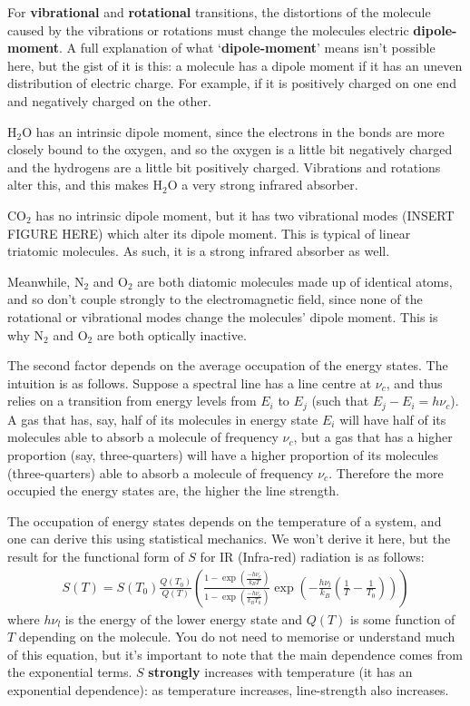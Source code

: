 For \textbf{vibrational} and \textbf{rotational} transitions, the distortions of the molecule caused by the vibrations or rotations must change the molecules electric \textbf{dipole-moment}. A full explanation of what `\textbf{dipole-moment}' means isn't possible here, but the gist of it is this: a molecule has a dipole moment if it has an uneven distribution of electric charge. For example, if it is positively charged on one end and negatively charged on the other.

H$_2$O has an intrinsic dipole moment, since the electrons in the bonds are more closely bound to the oxygen, and so the oxygen is a little bit negatively charged and the hydrogens are a little bit positively charged. Vibrations and rotations alter this, and this makes H$_2$O a very strong infrared absorber.

CO$_2$ has no intrinsic dipole moment, but it has two vibrational modes (INSERT FIGURE HERE) which alter its dipole moment. This is typical of linear triatomic molecules. As such, it is a strong infrared absorber as well.

Meanwhile, N$_2$ and O$_2$ are both diatomic molecules made up of identical atoms, and so don't couple strongly to the electromagnetic field, since none of the rotational or vibrational modes change the molecules' dipole moment. This is why N$_2$ and O$_2$ are both optically inactive.

The second factor depends on the average occupation of the energy states. The intuition is as follows. Suppose a spectral line has a line centre at $\nu_c$, and thus relies on a transition from energy levels from $E_i$ to $E_j$ (such that $E_j-E_i=h\nu_c$). A gas that has, say, half of its molecules in energy state $E_i$ will have half of its molecules able to absorb a molecule of frequency $\nu_c$, but a gas that has a higher proportion (say, three-quarters) will have a higher proportion of its molecules (three-quarters) able to absorb a molecule of frequency $\nu_c$. Therefore the more occupied the energy states are, the higher the line strength.

The occupation of energy states depends on the temperature of a system, and one can derive this using statistical mechanics. We won't derive it here, but the result for the functional form of $S$ for IR (Infra-red) radiation is as follows:
\begin{align*}
    S(T)=S(T_0)\frac{Q(T_0)}{Q(T)}\left( 
        \frac{1-\exp\left( \frac{-h\nu_c}{k_BT} \right)}{1-\exp\left( \frac{-h\nu_c}{k_BT_0} \right)}\exp\left( 
            -\frac{h\nu_l}{k_B}\left( \frac{1}{T}-\frac{1}{T_0} \right)
         \right)
     \right)
\end{align*}
where $h\nu_l$ is the energy of the lower energy state and $Q(T)$ is some function of $T$ depending on the molecule. You do not need to memorise or understand much of this equation, but it's important to note that the main dependence comes from the exponential terms. $S$ \textbf{strongly} increases with temperature (it has an exponential dependence): as temperature increases, line-strength also increases.

